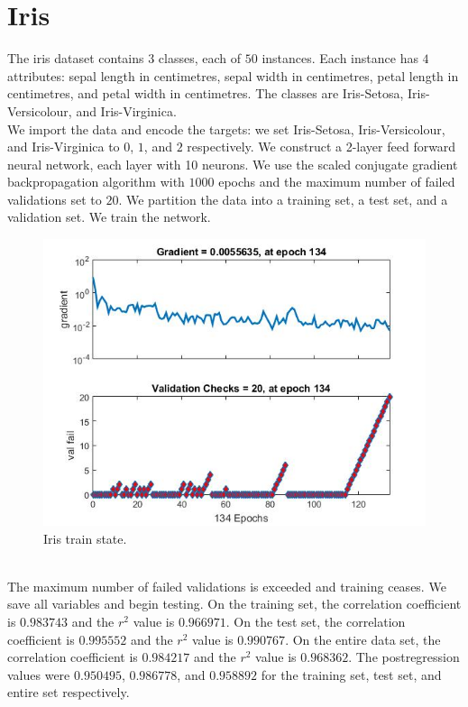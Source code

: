 \documentclass{article}%
\begin{document}
\section{Iris}
The iris dataset contains $3$ classes, each of $50$ instances. Each instance has $4$ attributes: sepal length in centimetres, sepal width in centimetres, petal length in centimetres, and petal width in centimetres. The classes are Iris-Setosa, Iris-Versicolour, and  Iris-Virginica. 
\\
We import the data and encode the targets: we set Iris-Setosa, Iris-Versicolour, and  Iris-Virginica to $0$, $1$, and $2$ respectively. We construct a 2-layer feed forward neural network, each layer with 10 neurons. We use the scaled conjugate gradient backpropagation algorithm with $1000$ epochs and the maximum number of failed validations set to $20$. We partition the data into a training set, a test set, and a validation set. We train the network.
\begin{figure}[H]
\centering
\includegraphics[scale=0.5]{Iris/train_state.jpg}
\caption{Iris train state.}
\label{fig:iristrain}
\end{figure}
\\
The maximum number of failed validations is exceeded and training ceases. We save all variables and begin testing. On the training set, the correlation coefficient is $0.983743$ and the $r^2$ value is $0.966971$. On the test set, the correlation coefficient is $0.995552$ and the $r^2$ value is $0.990767$. On the entire data set, the correlation coefficient is $0.984217$ and the $r^2$ value is $0.968362$. The postregression values were $0.950495$, $0.986778$, and $0.958892$ for the training set, test set, and entire set respectively.
\end{document}
